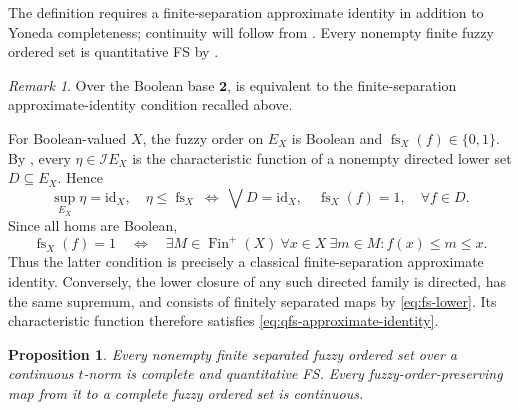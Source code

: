 \documentclass[preprint,3p,times]{elsarticle}
\newtheorem{proposition}[proposition]{Proposition}
\theoremstyle{definition}
\theoremstyle{remark}
\newtheorem{remark}[remark]{Remark}
\newcommand{\I}{\mathcal{I}}
\newcommand{\id}{\mathrm{id}}
\newcommand{\supop}{\operatorname{sup}}
\newcommand{\fs}{\operatorname{fs}}
\newcommand{\Finp}{\operatorname{Fin}^{+}}
\numberwithin{equation}{section}
\begin{document}
The definition requires a finite-separation approximate identity in addition to Yoneda completeness; continuity will follow from . Every nonempty finite fuzzy ordered set is quantitative FS by . 

\begin{remark}
\label{prop:boolean-recovery}
Over the Boolean base \(\mathbf2\),  is equivalent to the finite-separation approximate-identity condition recalled above. 


For Boolean-valued \(X\), the fuzzy order on \(E_X\) is Boolean and
\(\fs_X(f)\in\{0,1\}\). By , every
\(\eta\in\I E_X\) is the characteristic function of a nonempty directed
lower set \(D\subseteq E_X\). Hence
\[
 \supop_{E_X}\eta=\id_X,\quad\eta\leq\fs_X
 \ \Longleftrightarrow\
 \bigvee D=\id_X,\quad \fs_X(f)=1,\quad \forall f\in D.
\]
Since all homs are Boolean,
\[
 \fs_X(f)=1
 \quad\Longleftrightarrow\quad
 \exists M\in\Finp(X)\ \forall x\in X\ \exists m\in M:
 f(x)\leq m\leq x.
\]
Thus the latter condition is precisely a classical finite-separation
approximate identity. Conversely, the lower closure of any such directed
family is directed, has the same supremum, and consists of finitely
separated maps by \eqref{eq:fs-lower}.
Its characteristic function therefore satisfies
\eqref{eq:qfs-approximate-identity}. 
\end{remark}

\begin{proposition}\label{prop:finite-objects}
Every nonempty finite separated fuzzy ordered set over a continuous \(t\)-norm is complete and quantitative FS. Every fuzzy-order-preserving map from it to a complete fuzzy ordered set is continuous.
\end{proposition}
\end{document}
